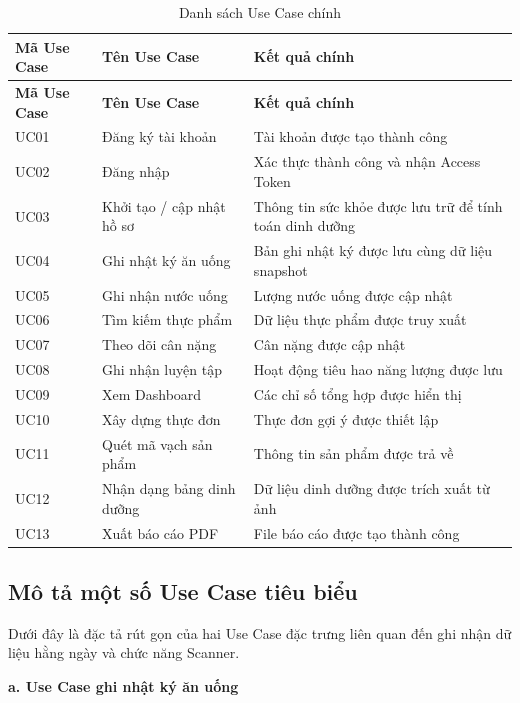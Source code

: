 \documentclass[12pt, a4paper]{report}
\begin{document}
\begin{longtable}{|>{\raggedright\arraybackslash}p{3cm}|>{\raggedright\arraybackslash}p{5cm}|>{\raggedright\arraybackslash}p{7cm}|}
\caption{Danh sách Use Case chính}
\label{tab:danh_sach_usecase} \\
\hline
\textbf{Mã Use Case} & \textbf{Tên Use Case} & \textbf{Kết quả chính} \\
\hline
\endfirsthead
\hline
\textbf{Mã Use Case} & \textbf{Tên Use Case} & \textbf{Kết quả chính} \\
\hline
\endhead

UC01 & Đăng ký tài khoản & Tài khoản được tạo thành công \\
\hline
UC02 & Đăng nhập & Xác thực thành công và nhận Access Token \\
\hline
UC03 & Khởi tạo / cập nhật hồ sơ & Thông tin sức khỏe được lưu trữ để tính toán dinh dưỡng \\
\hline
UC04 & Ghi nhật ký ăn uống & Bản ghi nhật ký được lưu cùng dữ liệu snapshot \\
\hline
UC05 & Ghi nhận nước uống & Lượng nước uống được cập nhật \\
\hline
UC06 & Tìm kiếm thực phẩm & Dữ liệu thực phẩm được truy xuất \\
\hline
UC07 & Theo dõi cân nặng & Cân nặng được cập nhật \\
\hline
UC08 & Ghi nhận luyện tập & Hoạt động tiêu hao năng lượng được lưu \\
\hline
UC09 & Xem Dashboard & Các chỉ số tổng hợp được hiển thị \\
\hline
UC10 & Xây dựng thực đơn & Thực đơn gợi ý được thiết lập \\
\hline
UC11 & Quét mã vạch sản phẩm & Thông tin sản phẩm được trả về \\
\hline
UC12 & Nhận dạng bảng dinh dưỡng & Dữ liệu dinh dưỡng được trích xuất từ ảnh \\
\hline
UC13 & Xuất báo cáo PDF & File báo cáo được tạo thành công \\
\hline
\end{longtable}

\subsection{Mô tả một số Use Case tiêu biểu}
Dưới đây là đặc tả rút gọn của hai Use Case đặc trưng liên quan đến ghi nhận dữ liệu hằng ngày và chức năng Scanner.

\textbf{a. Use Case ghi nhật ký ăn uống}
\end{document}
